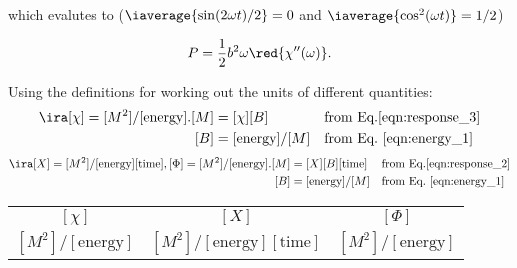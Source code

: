  \noindent  which  evalutes  to  ($   \iaverage{\sin(2\omega  t)/2}  =  0  $  and
 $ \iaverage{\cos^2(\omega t)} = 1/2 $)


 \begin{framed}\noindent
   \begin{equation}\label{eqn:energy_2}
     P = \frac{1}{2}b^2\omega\red{\chi''(\omega)}.
   \end{equation}
   \textbf{}

\end{framed}
Using the definitions for working out the units of different quantities:
\begin{equation}
  \begin{aligned} \ira [\chi] = [M^2]/[\text{energy}].
    [M] &= [\chi][B] &&\text{from Eq.\eqref{eqn:response_3}}\\
    [B] & = [\text{energy}]/[M] &&\text{from Eq.~\eqref{eqn:energy_1}}
  \end{aligned}
\end{equation}
\begin{equation}\label{eqn:unit1}
  \begin{aligned} \ira [X] = [M^2]/[\text{energy}][\text{time}], [\Phi] = [M^2]/[\text{energy}].
    [M] &= [X][B][\text{time}] &&\text{from Eq.\eqref{eqn:response_2}}\\
    [B] & = [\text{energy}]/[M] &&\text{from Eq.~\eqref{eqn:energy_1}}
  \end{aligned}
\end{equation}


\begin{center}
  \begin{tabular}{|c|c|c|}
    \hline
    $ [\chi] $ & $ [X] $ & $ [\Phi] $\\
    $ [M^2]/[\text{energy}] $&$ [M^2]/[\text{energy}][\text{time}] $ & $ [M^2]/[\text{energy}] $\\\hline
  \end{tabular}
\end{center}

